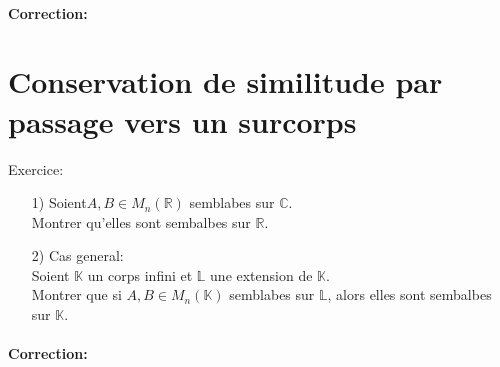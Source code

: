 \documentclass{book}
\begin{document}
\paragraph{Correction:}
\section{Conservation de similitude par passage vers un surcorps}
\begin{Ex}[]{Exercice:}{}
\begin{itemize}
    \item[1)] Soient\(A,B \in M_n(\mathbb{R})\) semblabes sur \(\mathbb{C}\).
\\ Montrer qu'elles sont sembalbes sur \(\mathbb{R}\).
\item[2)] Cas general:
\\ Soient \(\mathbb{K}\) un corps infini et \(\mathbb{L}\) une extension de \(\mathbb{K}\).
\\ Montrer que si \(A,B \in M_n(\mathbb{K})\) semblabes sur \(\mathbb{L}\), alors elles sont sembalbes sur \(\mathbb{K}\).
\end{itemize}

\end{Ex}
\paragraph{Correction:}
\end{document}

